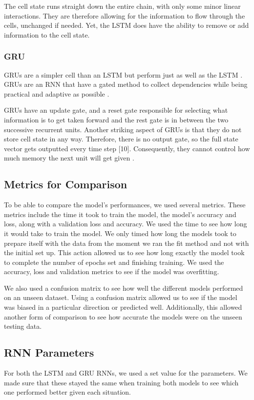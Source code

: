 \documentclass[a4paper,10pt]{article}
\begin{document}
	The cell state runs straight down the entire chain, with only some minor linear interactions. They are therefore allowing for the information to flow through the cells, unchanged if needed. Yet, the  LSTM does have the ability to remove or add information to the cell state.
		
	\subsubsection{GRU}
	GRUs are a simpler cell than an LSTM but perform just as well as the LSTM \cite{greff2016lstm}. GRUs are an RNN that have a gated method to collect dependencies while being practical and adaptive as possible \cite{cho2014learning}.
	
	GRUs have an update gate, and a reset gate responsible for selecting what information is to get taken forward and the rest gate is in between the two successive recurrent units. Another striking aspect of GRUs is that they do not store cell state in any way. Therefore, there is no output gate, so the full state vector gets outputted every time step [10]. Consequently, they cannot control how much memory the next unit will get given \cite{g4g}.

\subsection{Metrics for Comparison}
	To be able to compare the model's performances, we used several metrics. These metrics include the time it took to train the model, the model's accuracy and loss, along with a validation loss and accuracy. We used the time to see how long it would take to train the model. We only timed how long the models took to prepare itself with the data from the moment we ran the fit method and not with the initial set up. This action allowed us to see how long exactly the model took to complete the number of epochs set and finishing training. We used the accuracy, loss and validation metrics to see if the model was overfitting. 
	
	We also used a confusion matrix to see how well the different models performed on an unseen dataset. Using a confusion matrix allowed us to see if the model was biased in a particular direction or predicted well. Additionally, this allowed another form of comparison to see how accurate the models were on the unseen testing data.

\subsection{RNN Parameters}
	For both the LSTM and GRU RNNs, we used a set value for the parameters. We made sure that these stayed the same when training both models to see which one performed better given each situation. 
	
\end{document}
